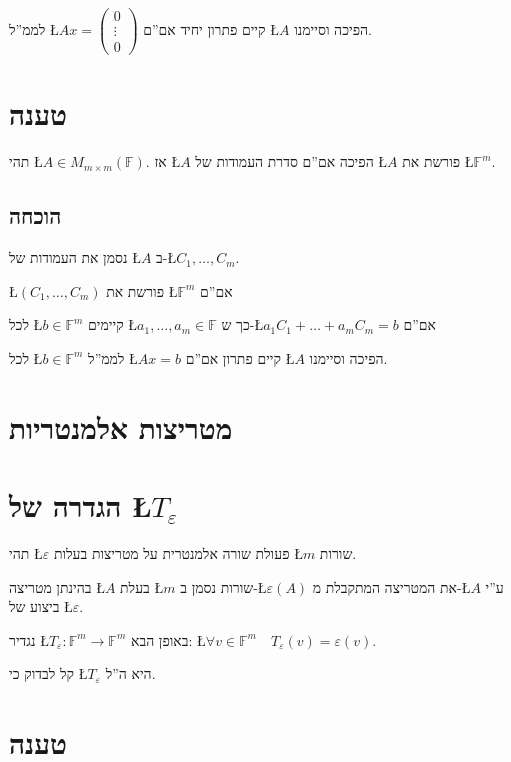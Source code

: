 \documentclass[english,hebrew]{article}
\begin{document}
לממ\textquotedblright ל \L{$Ax=\begin{pmatrix}0\\
\vdots\\
0
\end{pmatrix}$} קיים פתרון יחיד אם\textquotedblright ם \L{$A$} הפיכה וסיימנו.

\section{טענה}

תהי \L{$A\in M_{m\times m}(\mathbb{F})$}. אז \L{$A$} הפיכה אם\textquotedblright ם
סדרת העמודות של \L{$A$} פורשת את \L{$\mathbb{F}^{m}$}.

\subsection{הוכחה}

נסמן את העמודות של \L{$A$} ב-\L{$C_{1},\dots,C_{m}$}.

\L{$(C_{1},\dots,C_{m})$} פורשת את \L{$\mathbb{F}^{m}$} אם\textquotedblright ם

לכל \L{$b\in\mathbb{F}^{m}$} קיימים \L{$a_{1},\dots,a_{m}\in\mathbb{F}$}
כך ש-\L{$a_{1}C_{1}+\dots+a_{m}C_{m}=b$} אם\textquotedblright ם

לכל \L{$b\in\mathbb{F}^{m}$} לממ\textquotedblright ל \L{$Ax=b$}
קיים פתרון אם\textquotedblright ם \L{$A$} הפיכה וסיימנו.

\section{מטריצות אלמנטריות}

\section{הגדרה של \L{$T_{\varepsilon}$}}

תהי \L{$\varepsilon$} פעולת שורה אלמנטרית על מטריצות בעלות \L{$m$}
שורות.

בהינתן מטריצה \L{$A$} בעלת \L{$m$} שורות נסמן ב-\L{$\varepsilon(A)$}
את המטריצה המתקבלת מ-\L{$A$} ע\textquotedblright י ביצוע של \L{$\varepsilon$}.

נגדיר \L{$T_{\varepsilon}:\mathbb{F}^{m}\rightarrow\mathbb{F}^{m}$}
באופן הבא: \L{$\forall v\in\mathbb{F}^{m}\quad T_{\varepsilon}(v)=\varepsilon(v)$}.

קל לבדוק כי \L{$T_{\varepsilon}$} היא ה\textquotedblright ל.

\section{טענה}
\end{document}
